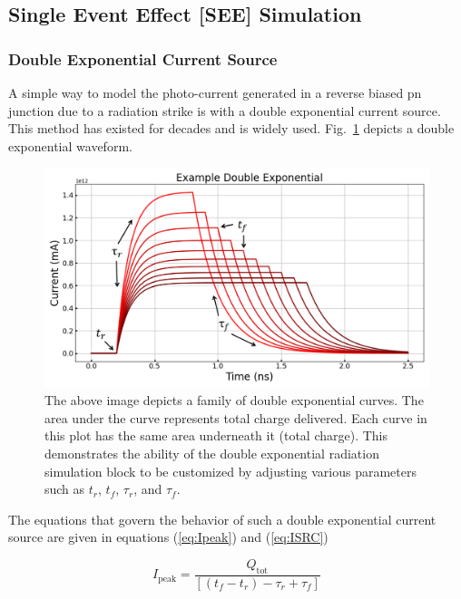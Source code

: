 \documentclass[conference]{IEEEtran}
\begin{document}
    

    \subsection{Single Event Effect [SEE] Simulation}\label{subsec:single-event-effect-[see]-simulation}

    \subsubsection{Double Exponential Current Source}
    A simple way to model the photo-current generated in a reverse biased pn junction due to a radiation strike is with a double exponential current source.
    This method has existed for decades and is widely used.
    Fig.~\ref{fig:double_exp} depicts a double exponential waveform.

    \begin{figure}[htbp]
        \centering
        \includegraphics[width=0.95\linewidth]{double_exp_param}
        \caption{The above image depicts a family of double exponential curves. The area under the curve represents total charge delivered. Each curve in this plot has the same area underneath it (total charge). This demonstrates the ability of the double exponential radiation simulation block to be customized by adjusting various parameters such as \(t_r\), \(t_f\), \(\tau_r\), and \(\tau_f\).}
        \label{fig:double_exp}
    \end{figure}
    
    The equations that govern the behavior of such a double exponential current source are given in equations (\ref{eq:Ipeak}) and (\ref{eq:ISRC})
    
        \begin{equation}
        I_{\text{peak}} = \frac{Q_{\text{tot}}}{[(t_f - t_r) - \tau_r + \tau_f]}\label{eq:Ipeak}
    \end{equation}
\end{document}
